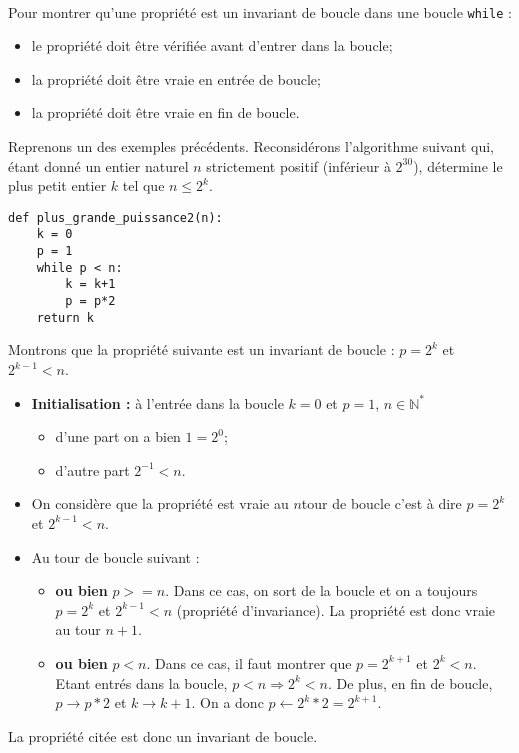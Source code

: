 \begin{methode}~\\
Pour montrer qu'une propriété est un invariant de boucle dans une boucle \texttt{while} :
\begin{itemize}
\item le propriété doit être vérifiée avant d'entrer dans la boucle;
\item la propriété doit être vraie en entrée de boucle;
\item la propriété doit être vraie en fin de boucle.
\end{itemize}
\end{methode}
%


Reprenons un des exemples précédents. Reconsidérons l’algorithme suivant qui, étant donné un entier naturel $n$ strictement positif (inférieur à $2^{30}$), détermine le plus petit entier $k$ tel que $n \leq 2^k$.
\begin{lstlisting}
def plus_grande_puissance2(n):
    k = 0
    p = 1
    while p < n:
        k = k+1
        p = p*2
    return k
\end{lstlisting}
\begin{demo}
Montrons que la propriété suivante est un invariant de boucle : $p=2^k$ et $2^{k-1}<n$.
\begin{itemize}
\item \textbf{Initialisation : }à l'entrée dans la boucle $k=0$ et $p=1$, $n\in\mathbb{N}^*$
\begin{itemize}
\item d'une part  on a bien $1=2^0$;
\item d'autre part $2^{-1}<n$.
\end{itemize}
\item On considère que la propriété est vraie au $n$\ieme tour de boucle c'est à dire $p=2^k$ et $2^{k-1}<n$.
\item Au tour de boucle suivant : 
\begin{itemize}
\item \textbf{ou bien} $p>=n$. Dans ce cas, on sort de la boucle et on a toujours $p=2^k$ et $2^{k-1}<n$ (propriété d'invariance). La propriété est donc vraie au tour $n+1$.
\item \textbf{ou bien} $p<n$. Dans ce cas, il faut montrer que  $p=2^{k+1}$ et $2^{k}<n$. Etant entrés dans la boucle, $p<n \Rightarrow 2^k<n$. De plus, en fin de boucle, $p\rightarrow p *2$ et $k\rightarrow k+1$. On a donc $p\leftarrow 2^k *2=2^{k+1}$. 
\end{itemize}
\end{itemize}
La propriété citée est donc un invariant de boucle. 
\end{demo}

